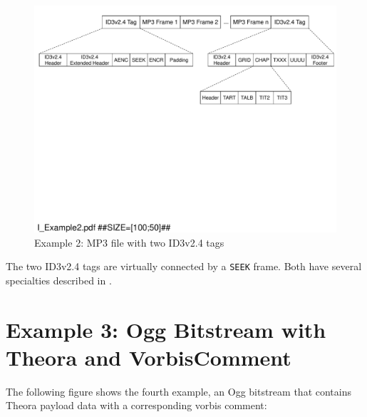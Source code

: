 \begin{figure}[H]
\centering
\includegraphics[width=1.00\textwidth]{figures/I_Example2.pdf}
\caption{Example 2: MP3 file with two ID3v2.4 tags}
\label{fig:Example1MP3filewithtwoID3tags}
\end{figure}

The two ID3v2.4 tags are virtually connected by a \texttt{SEEK} frame. Both have several specialties described in \cite{MC17}.


\section{Example 3: Ogg Bitstream with Theora and VorbisComment}
\label{sec:Example4MP3FileWithID3v23AndID3v11}

The following figure shows the fourth example, an Ogg bitstream that contains Theora payload data with a corresponding vorbis comment:

